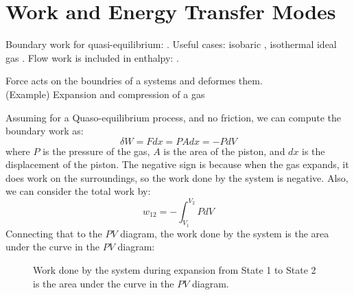 \documentclass[11pt]{report}
\begin{document}
\section{Work and Energy Transfer Modes}
\begin{review}
Boundary work for quasi-equilibrium: . Useful cases: isobaric , isothermal ideal gas . Flow work is included in enthalpy: .
\end{review}
\begin{definition}
    Force acts on the boundries of a systems and deformes them. \\
    (Example) Expansion and compression of a gas 

    Assuming for a Quaso-equilibrium process, and no friction, we can compute the boundary work as:
    \begin{equation}
        \delta W = F dx  = P A dx = - P dV
    \end{equation}
    where $P$ is the pressure of the gas, $A$ is the area of the piston, and $dx$ is the displacement of the piston. The negative sign is because when the gas expands, it does work on the surroundings, so the work done by the system is negative. Also, we can consider the total work by:
    \begin{equation}
        w_{12} = -\int_{V_1}^{V_2} P dV
    \end{equation}
     Connecting that to the $PV$ diagram, the work done by the system is the area under the curve in the $PV$ diagram:

\begin{figure}[h!]
    \centering
    \caption{Work done by the system during expansion from State 1 to State 2 is the area under the curve in the $PV$ diagram.}
\end{figure}

\end{definition}
\newpage
\end{document}
